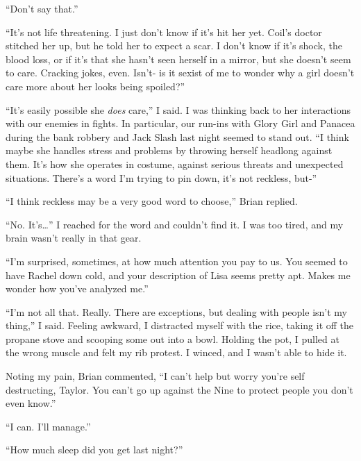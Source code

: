 ``Don't say that.''



``It's not life threatening.  I just don't know if it's hit her yet.  Coil's doctor stitched her up, but he told her to expect a scar.  I don't know if it's shock, the blood loss, or if it's that she hasn't seen herself in a mirror, but she doesn't seem to care.  Cracking jokes, even.  Isn't- is it sexist of me to wonder why a girl doesn't care more about her looks being spoiled?''



``It's easily possible she \emph{does} care,'' I said.  I was thinking back to her interactions with our enemies in fights.  In particular, our run-ins with Glory Girl and Panacea during the bank robbery and Jack Slash last night seemed to stand out.  ``I think maybe she handles stress and problems by throwing herself headlong against them.  It's how she operates in costume, against serious threats and unexpected situations.  There's a word I'm trying to pin down, it's not reckless, but-''



``I think reckless may be a very good word to choose,'' Brian replied.



``No.  It's\ldots'' I reached for the word and couldn't find it.  I was too tired, and my brain wasn't really in that gear.



``I'm surprised, sometimes, at how much attention you pay to us.  You seemed to have Rachel down cold, and your description of Lisa seems pretty apt.  Makes me wonder how you've analyzed me.''



``I'm not all that.  Really.  There are exceptions, but dealing with people isn't my thing,'' I said.  Feeling awkward, I distracted myself with the rice, taking it off the propane stove and scooping some out into a bowl.  Holding the pot, I pulled at the wrong muscle and felt my rib protest.  I winced, and I wasn't able to hide it.



Noting my pain, Brian commented, ``I can't help but worry you're self destructing, Taylor.  You can't go up against the Nine to protect people you don't even know.''



``I can.  I'll manage.''



``How much sleep did you get last night?''



